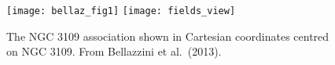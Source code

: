 \begin{figure}
\caption{The NGC 3109 association shown in Cartesian coordinates centred on NGC 3109. From Bellazzini et al.\ (2013).}
\texttt{[image: bellaz\_fig1]}
\texttt{[image: fields\_view]}


\end{figure}



